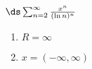 {$\ds\sum_{n=2}^\infty \frac{x^n}{(\ln n)^n}$}
{\begin{enumerate}
	\item $R=\infty$
	\item $x=(-\infty,\infty)$
\end{enumerate}}